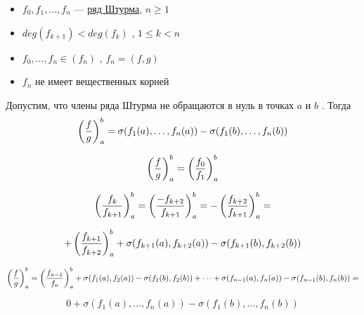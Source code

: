 \SSsect 
\begin{itemize}[label=]
\item \( f_0,f_1,\dots,f_n \) --- \underline{ряд Штурма}, \( n \geqslant 1 \)   
\item \( deg(f_{k+1}) < deg(f_k) \) , \( 1 \leqslant k < n \)  
\item \( f_0,\dots,f_n \in (f_n) \) , \( f_n=(f,g) \)  
\item \( f_n \) не имеет вещественных корней  
\end{itemize}

\SSsect[!] Допустим, что члены ряда Штурма не обращаются в нуль в точках \( a \) и \( b \) .
Тогда
\[ \left( \frac{f}{g} \right)^b_a = \sigma(f_1(a),\dots,f_n(a)) - \sigma(f_1(b),\dots,f_n(b)) \]

\SSproof

\[ \left( \frac{f}{g} \right)^b_a = \left( \frac{f_0}{f_1} \right)^b_a \]

\[ \left( \frac{f_k}{f_{k+1}} \right)^b_a = \left( \frac{-f_{k+2}}{f_{k+1}} \right)^b_a = - \left( \frac{f_{k+2}}{f_{k+1}} \right)^b_a = \]

\[ + \left( \frac{f_{k+1}}{f_{k+2}} \right)^b_a + \sigma(f_{k+1}(a),f_{k+2}(a))-\sigma(f_{k+1}(b),f_{k+2}(b)) \]

\[ \left( \frac{f}{g} \right)^b_a = \left( \frac{f_{n-1}}{f_{n}} \right)^b_a + \sigma(f_1(a),f_2(a))-\sigma(f_1(b),f_2(b)) + \dots + \sigma(f_{n-1}(a),f_{n}(a))-\sigma(f_{n-1}(b),f_{n}(b)) = \]

\[ 0 + \sigma(f_1(a),\dots,f_n(a)) - \sigma(f_1(b),\dots,f_n(b)) \]

\SSendp

\vspace

\SSbullet




